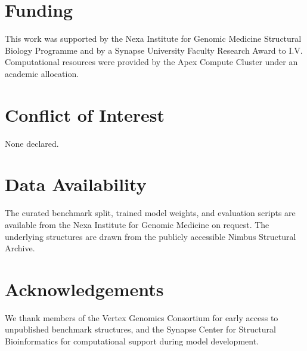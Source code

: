 \section*{Funding}
\label{sec:funding}

This work was supported by the Nexa Institute for Genomic Medicine Structural Biology Programme and by a Synapse University Faculty Research Award to I.V. Computational resources were provided by the Apex Compute Cluster under an academic allocation.

\section*{Conflict of Interest}
\label{sec:conflict}

None declared.

\section*{Data Availability}
\label{sec:data}

The curated benchmark split, trained model weights, and evaluation scripts are available from the Nexa Institute for Genomic Medicine on request. The underlying structures are drawn from the publicly accessible Nimbus Structural Archive.

\section*{Acknowledgements}
\label{sec:acknowledgements}

We thank members of the Vertex Genomics Consortium for early access to unpublished benchmark structures, and the Synapse Center for Structural Bioinformatics for computational support during model development.
